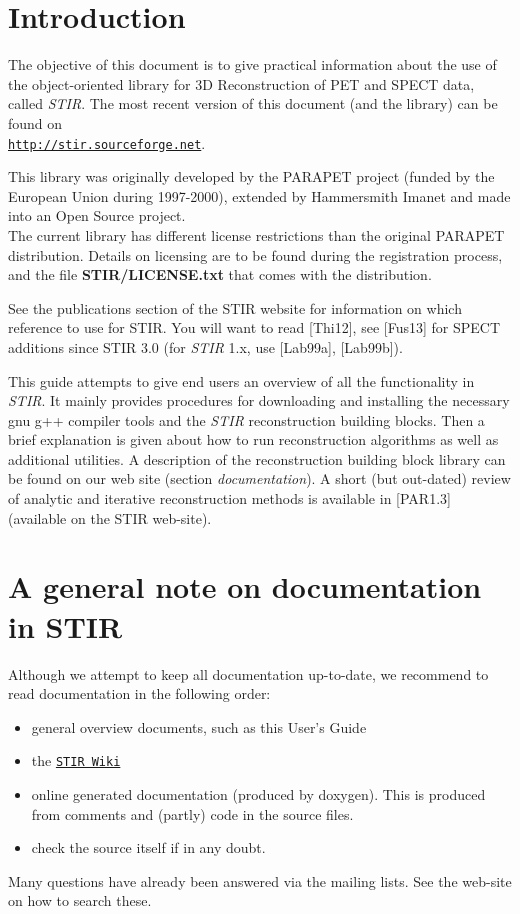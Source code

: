 \documentclass{article}
\def\R2Lurl#1#2{\mbox{\href{#1}{\tt #2}}}
\begin{document}
\newpage

\tableofcontents


\section{
Introduction}

The objective of this document is to give practical information 
about the use of the object-oriented library for 3D Reconstruction 
of PET and SPECT data, called \textit{STIR}. The most recent version of this 
document (and the library) can be found on \\
\R2Lurl{http://stir.sourceforge.net}{http://stir.sourceforge.net}.


This library was originally developed by the PARAPET 
project (funded by the European Union during 1997-2000), extended by Hammersmith 
Imanet and made into an Open Source project. \\
The current library has different license restrictions than the 
original PARAPET distribution. Details on licensing are to be 
found during the registration process, and the file \textbf{STIR/LICENSE.txt} 
that comes with the distribution. 

See the publications section of the STIR website for information on which reference
to use for STIR. You will want to read {[}Thi12], see {[}Fus13] for SPECT additions
since STIR 3.0 (for \textit{STIR} 1.x, use [Lab99a], [Lab99b]).



This guide attempts to give end users an overview of all the functionality
in \textit{STIR}. It mainly provides 
procedures for downloading and installing the necessary gnu g++ 
compiler tools and the \textit{STIR} reconstruction building blocks. 
Then a brief explanation is given about how to run reconstruction 
algorithms as well as additional utilities. A description of 
the reconstruction building block library can be found on our 
web site (section \textit{documentation}). A short (but out-dated) review of analytic 
and iterative reconstruction methods is available in [PAR1.3] 
(available on the STIR web-site).

\section{
A general note on documentation in STIR}

Although we attempt to keep all documentation up-to-date, we 
recommend to read documentation in the following order:
\begin{itemize}
\item general overview documents, such as this User's Guide
\item the \R2Lurl{http://sourceforge.net/apps/mediawiki/stir}{STIR Wiki}
\item 
online generated documentation (produced by doxygen). This is 
produced from comments and (partly) code in the source files.
\item check the source itself if in any doubt.
\end{itemize}
Many questions have already been answered via the mailing lists. See the
web-site on how to search these.
\end{document}
